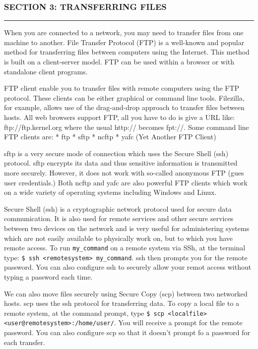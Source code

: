 \subsubsection{SECTION 3: TRANSFERRING
FILES}\label{section-3-transferring-files}

\begin{center}\rule{3in}{0.4pt}\end{center}

When you are connected to a network, you may need to transfer files from
one machine to another. File Transfer Protocol (FTP) is a well-known and
popular method for transferring files between computers using the
Internet. This method is built on a client-server model. FTP can be used
within a browser or with standalone client programs.

FTP client enable you to transfer files with remote computers using the
FTP protocol. These clients can be either graphical or command line
tools. Filezilla, for example, allows use of the drag-and-drop approach
to transfer files between hosts. All web browsers support FTP, all you
have to do is give a URL like: ftp://ftp.kernel.org where the usual
http:// becomes fpt://. Some command line FTP clients are: * ftp * sftp
* ncftp * yafc (Yet Another FTP Client)

sftp is a very secure mode of connection which uses the Secure Shell
(ssh) protocol. sftp encrypts its data and thus sensitive information is
transmitted more securely. However, it does not work with so-called
anonymous FTP (gues user credentials.) Both ncftp and yafc are also
powerful FTP clients which work on a wide variety of operating systems
including Windows and Linux.

Secure Shell (ssh) is a cryptographic network protocol used for secure
data communication. It is also used for remote services and other secure
services between two devices on the network and is very useful for
administering systems which are not easily available to physically work
on, but to which you have remote access. To run \texttt{my\_command} on
a remote system via SSh, at the terminal type:
\texttt{\$ ssh \textless{}remotesystem\textgreater{} my\_command}. ssh
then prompts you for the remote password. You can also configure ssh to
securely allow your remot access without typing a password each time.

We can also move files securely using Secure Copy (scp) between two
networked hosts. scp uses the ssh protocol for transferring data. To
copy a local file to a remote system, at the command prompt, type
\texttt{\$ scp \textless{}localfile\textgreater{} \textless{}user@remotesystem\textgreater{}:/home/user/}.
You will receive a prompt for the remote password. You can also
configure scp so that it doesn't prompt fo a password for each transfer.

